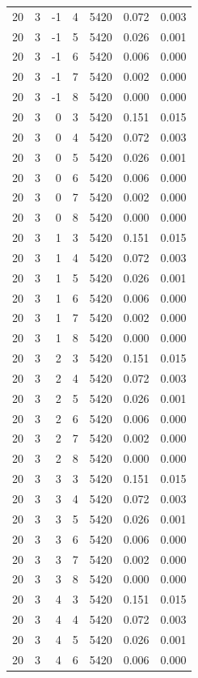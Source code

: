 \begin{table}
\begin{tabular}{rrrrrrr}
20 & 3 & -1 & 4 & 5420 & 0.072 & 0.003 \\
20 & 3 & -1 & 5 & 5420 & 0.026 & 0.001 \\
20 & 3 & -1 & 6 & 5420 & 0.006 & 0.000 \\
20 & 3 & -1 & 7 & 5420 & 0.002 & 0.000 \\
20 & 3 & -1 & 8 & 5420 & 0.000 & 0.000 \\
20 & 3 & 0 & 3 & 5420 & 0.151 & 0.015 \\
20 & 3 & 0 & 4 & 5420 & 0.072 & 0.003 \\
20 & 3 & 0 & 5 & 5420 & 0.026 & 0.001 \\
20 & 3 & 0 & 6 & 5420 & 0.006 & 0.000 \\
20 & 3 & 0 & 7 & 5420 & 0.002 & 0.000 \\
20 & 3 & 0 & 8 & 5420 & 0.000 & 0.000 \\
20 & 3 & 1 & 3 & 5420 & 0.151 & 0.015 \\
20 & 3 & 1 & 4 & 5420 & 0.072 & 0.003 \\
20 & 3 & 1 & 5 & 5420 & 0.026 & 0.001 \\
20 & 3 & 1 & 6 & 5420 & 0.006 & 0.000 \\
20 & 3 & 1 & 7 & 5420 & 0.002 & 0.000 \\
20 & 3 & 1 & 8 & 5420 & 0.000 & 0.000 \\
20 & 3 & 2 & 3 & 5420 & 0.151 & 0.015 \\
20 & 3 & 2 & 4 & 5420 & 0.072 & 0.003 \\
20 & 3 & 2 & 5 & 5420 & 0.026 & 0.001 \\
20 & 3 & 2 & 6 & 5420 & 0.006 & 0.000 \\
20 & 3 & 2 & 7 & 5420 & 0.002 & 0.000 \\
20 & 3 & 2 & 8 & 5420 & 0.000 & 0.000 \\
20 & 3 & 3 & 3 & 5420 & 0.151 & 0.015 \\
20 & 3 & 3 & 4 & 5420 & 0.072 & 0.003 \\
20 & 3 & 3 & 5 & 5420 & 0.026 & 0.001 \\
20 & 3 & 3 & 6 & 5420 & 0.006 & 0.000 \\
20 & 3 & 3 & 7 & 5420 & 0.002 & 0.000 \\
20 & 3 & 3 & 8 & 5420 & 0.000 & 0.000 \\
20 & 3 & 4 & 3 & 5420 & 0.151 & 0.015 \\
20 & 3 & 4 & 4 & 5420 & 0.072 & 0.003 \\
20 & 3 & 4 & 5 & 5420 & 0.026 & 0.001 \\
20 & 3 & 4 & 6 & 5420 & 0.006 & 0.000 \\

\end{tabular}
\end{table}
